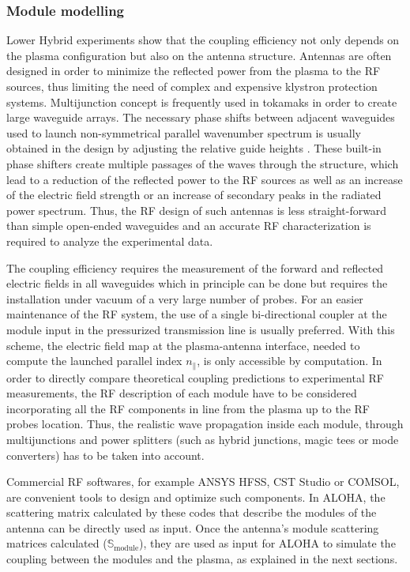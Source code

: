 \subsubsection{Module modelling}\label{sub:module_modeling}

Lower Hybrid experiments show that the coupling efficiency not only depends on the plasma configuration but also on the antenna structure. Antennas are often designed in order to minimize the reflected power from the plasma to the RF sources, thus limiting the need of complex and expensive klystron protection systems. Multijunction concept is frequently used in tokamaks in order to create large waveguide arrays. The necessary phase shifts between adjacent waveguides used to launch non-symmetrical parallel wavenumber spectrum is usually obtained in the design by adjusting the relative guide heights . These built-in phase shifters create multiple passages of the waves through the structure, which lead to a reduction of the reflected power to the RF sources as well as an increase of the electric field strength or an increase of secondary peaks in the radiated power spectrum. Thus, the RF design of such antennas is less straight-forward than simple open-ended waveguides and an accurate RF characterization is required to analyze the experimental data.

The coupling efficiency requires the measurement of the forward and reflected electric fields in all waveguides which in principle can be done but requires the installation under vacuum of a very large number of probes. For an easier maintenance of the RF system, the use of a single bi-directional coupler at the module input in the pressurized transmission line is usually preferred. With this scheme, the electric field map at the plasma-antenna interface, needed to compute the launched parallel index $n_{\parallel}$, is only accessible by computation. In order to directly compare theoretical coupling predictions to experimental RF measurements, the RF description of each module have to be considered incorporating all the RF components in line from the plasma up to the RF probes location. Thus, the realistic wave propagation inside each module, through multijunctions and power splitters (such as hybrid junctions, magic tees or mode converters) has to be taken into account. 

Commercial RF softwares, for example ANSYS HFSS, CST Studio or COMSOL, are convenient tools to design and optimize such components. In ALOHA, the scattering matrix calculated by these codes that describe the modules of the antenna can be directly used as input. Once the antenna's module scattering matrices calculated ($\mathbb{S}_{\mbox{module}}$), they are used as input for ALOHA to simulate the coupling between the modules and the plasma, as explained in the next sections.


